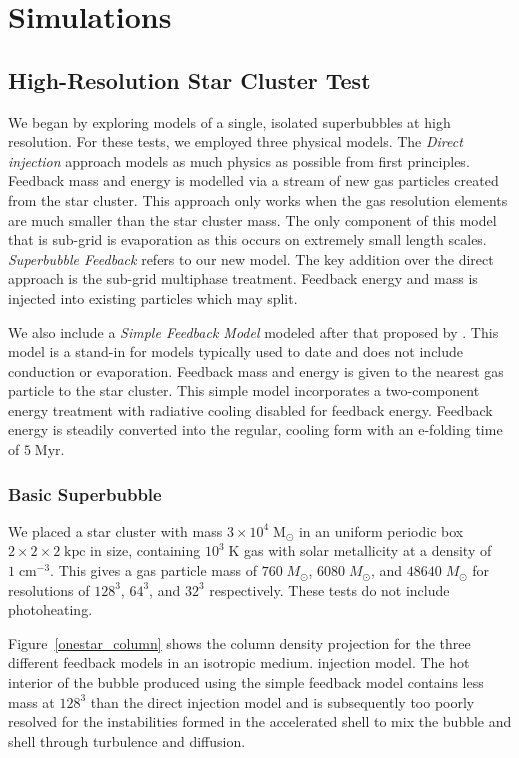 \section{Simulations}
\subsection{High-Resolution Star Cluster Test}\label{cluster}
We began by exploring models of a single, isolated superbubbles at high
resolution.  For these tests, we employed three physical models.  The {\it
Direct injection} approach models as much physics as possible from first
principles.  Feedback mass and energy is modelled via a stream of new gas
particles created from the star cluster.  This approach only works when the gas
resolution elements are much smaller than the star cluster mass.  The only
component of this model that is sub-grid is evaporation as this occurs on
extremely small length scales.  {\it Superbubble Feedback} refers to our new
model.  The key addition over the direct approach is the sub-grid multiphase
treatment.  Feedback energy and mass is injected into existing particles which
may split.  

We also include a {\it Simple Feedback
Model} modeled after that proposed by \citet{Agertz2013}.  This model is a
stand-in for models typically used to date and does not include conduction or
evaporation.  Feedback mass and energy is given to the nearest gas particle to
the star cluster.  This simple model incorporates a two-component energy
treatment with radiative cooling disabled for feedback energy.  Feedback energy
is steadily converted into the regular, cooling form with an e-folding time of
$5\;\mathrm{Myr}$. 

\subsubsection{Basic Superbubble}

We placed a star cluster with mass $3\times10^4\;\mathrm{M_\odot}$ in an uniform
periodic box $2\times2\times2\;\mathrm{kpc}$ in size, containing
$10^3\;\mathrm{K}$ gas with solar metallicity at a density of
$1\;\mathrm{cm^{-3}}$.   This gives a gas particle mass of $760\; M_\odot$,
$6080\; M_\odot$, and $48640\; M_\odot$ for resolutions of $128^3$, $64^3$, and
$32^3$ respectively.  These tests do not include photoheating. 

Figure~\ref{onestar_column} shows the column density projection for the three
different feedback models in an isotropic medium.  injection model.   The hot
interior of the bubble produced using the simple feedback model contains less
mass at $128^3$ than the direct injection model and is subsequently too poorly
resolved for the instabilities formed in the accelerated shell
\citep{Vishniac1983} to mix the bubble and shell through turbulence and
diffusion.


